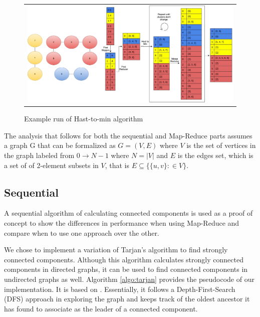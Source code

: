 \begin{figure}[!t]
\begin{tabular}{@{}c@{}}
 	\begin{minipage}{42pc}
 		\centering
 		\includegraphics[width=40pc]{figures/mapreduce_example.pdf}
 		\caption{Example run of Hast-to-min algorithm}
 		\label{figure:mapreduce_example}
	\end{minipage}
\end{tabular}
\end{figure}

The analysis that follows for both the sequential and Map-Reduce parts assumes a graph G that can be formalized as $G=(V,E)$ where $V$ is the set of vertices in the graph labeled from $0 \to N-1$ where $N=|V|$ and $E$ is the edges set, which is a set of of 2-element subsets in $V$, that is $E \subseteq \{\{u,v\}: \in V\}$.

\subsection{Sequential}
A sequential algorithm of calculating connected components is used as a proof of concept to show the differences in performance when using Map-Reduce and compare when to use one approach over the other.

We chose to implement a variation of Tarjan's algorithm to find strongly connected components. Although this algorithm calculates strongly connected components in directed graphs, it can be used to find connected components in undirected graphs as well. Algorithm \ref{algo:tarjan} provides the pseudocode of our implementation. It is based on \cite{tarjan}. Essentially, it follows a Depth-First-Search (DFS) approach in exploring the graph and keeps track of the oldest ancestor it has found to associate as the leader of a connected component.

